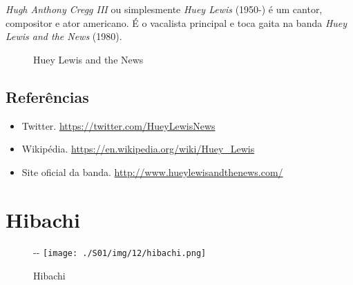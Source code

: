 \emph{Hugh Anthony Cregg III} ou simplesmente \emph{Huey Lewis} (1950-)
é um cantor, compositor e ator americano. É o vacalista principal e toca
gaita na banda \emph{Huey Lewis and the News} (1980).

\begin{figure}
  \centering
    \caption{Huey Lewis and the News\label{fig:huey-lewis-and-the-news}}
\end{figure}

\hypertarget{referuxeancias-2}{%
\subsection{Referências}\label{referuxeancias-2}}

\begin{itemize}
\tightlist
\item
  \sloppy Twitter. \url{https://twitter.com/HueyLewisNews}
\item
  \sloppy Wikipédia. \url{https://en.wikipedia.org/wiki/Huey_Lewis}
\item
  \sloppy Site oficial da banda. \url{http://www.hueylewisandthenews.com/}
\end{itemize}

\hypertarget{hibachi}{%
\section{Hibachi}\label{hibachi}}

\begin{figure}[!ht]
  \begin{adjustwidth}{-\oddsidemargin-1in}{-\rightmargin}
    \centering
    \texttt{[image: ./S01/img/12/hibachi.png]}
    \caption{Hibachi\label{fig:hibachi}}
  \end{adjustwidth}
\end{figure}

